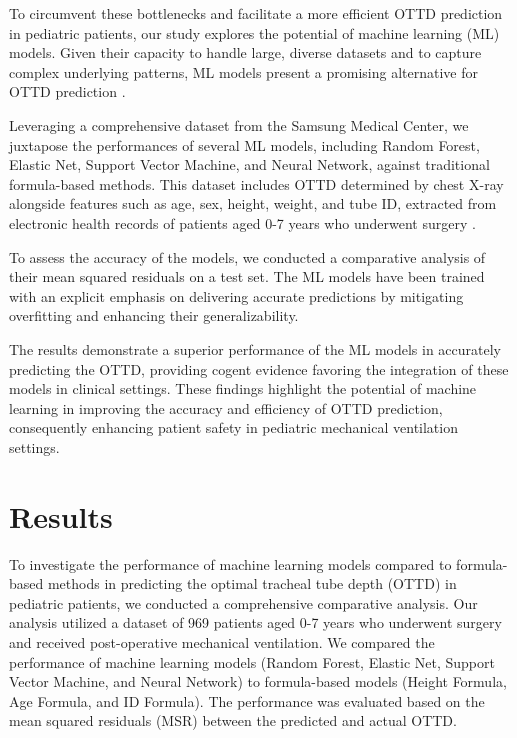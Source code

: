 \documentclass[11pt]{article}
\begin{document}
To circumvent these bottlenecks and facilitate a more efficient OTTD prediction in pediatric patients, our study explores the potential of machine learning (ML) models. Given their capacity to handle large, diverse datasets and to capture complex underlying patterns, ML models present a promising alternative for OTTD prediction \cite{Peine2021DevelopmentAV, Bendavid2022ANM}.

Leveraging a comprehensive dataset from the Samsung Medical Center, we juxtapose the performances of several ML models, including Random Forest, Elastic Net, Support Vector Machine, and Neural Network, against traditional formula-based methods. This dataset includes OTTD determined by chest X-ray alongside features such as age, sex, height, weight, and tube ID, extracted from electronic health records of patients aged 0-7 years who underwent surgery \cite{Ingelse2017EarlyFO, Dillier2004LaryngealDD}. 

\cite{Blevins2015ThePS, Ebuchi2000EvaluationOW} To assess the accuracy of the models, we conducted a comparative analysis of their mean squared residuals on a test set. The ML models have been trained with an explicit emphasis on delivering accurate predictions by mitigating overfitting and enhancing their generalizability. 

The results demonstrate a superior performance of the ML models in accurately predicting the OTTD, providing cogent evidence favoring the integration of these models in clinical settings. These findings highlight the potential of machine learning in improving the accuracy and efficiency of OTTD prediction, consequently enhancing patient safety in pediatric mechanical ventilation settings.

\section*{Results}

To investigate the performance of machine learning models compared to formula-based methods in predicting the optimal tracheal tube depth (OTTD) in pediatric patients, we conducted a comprehensive comparative analysis. Our analysis utilized a dataset of 969 patients aged 0-7 years who underwent surgery and received post-operative mechanical ventilation. We compared the performance of machine learning models (Random Forest, Elastic Net, Support Vector Machine, and Neural Network) to formula-based models (Height Formula, Age Formula, and ID Formula). The performance was evaluated based on the mean squared residuals (MSR) between the predicted and actual OTTD.
\end{document}
